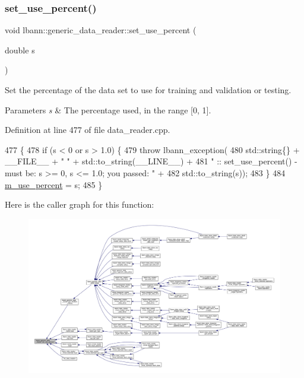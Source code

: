 \subsubsection{\texorpdfstring{set\+\_\+use\+\_\+percent()}{set\_use\_percent()}}
{\footnotesize\ttfamily void lbann\+::generic\+\_\+data\+\_\+reader\+::set\+\_\+use\+\_\+percent (\begin{DoxyParamCaption}\item[{double}]{s }\end{DoxyParamCaption})}

Set the percentage of the data set to use for training and validation or testing. 
\begin{DoxyParams}{Parameters}
{\em s} & The percentage used, in the range \mbox{[}0, 1\mbox{]}. \\
\hline
\end{DoxyParams}


Definition at line 477 of file data\+\_\+reader.\+cpp.


\begin{DoxyCode}
477                                                   \{
478   \textcolor{keywordflow}{if} (s < 0 or s > 1.0) \{
479     \textcolor{keywordflow}{throw} lbann\_exception(
480       std::string\{\} + \_\_FILE\_\_ + \textcolor{stringliteral}{" "} + std::to\_string(\_\_LINE\_\_) +
481       \textcolor{stringliteral}{" :: set\_use\_percent() - must be: s >= 0, s <= 1.0; you passed: "} +
482       std::to\_string(s));
483   \}
484   \hyperlink{classlbann_1_1generic__data__reader_a8b475834bd80e7103c3631d2b061aabc}{m\_use\_percent} = s;
485 \}
\end{DoxyCode}
Here is the caller graph for this function\+:\nopagebreak
\begin{figure}[H]
\begin{center}
\leavevmode
\includegraphics[width=350pt]{classlbann_1_1generic__data__reader_ae6929a8bd2e59da72a8c2e537f0b2b37_icgraph}
\end{center}
\end{figure}
\mbox{\label{classlbann_1_1generic__data__reader_a18b67bfa426eb4d2c8195d115c4df49f}} 
